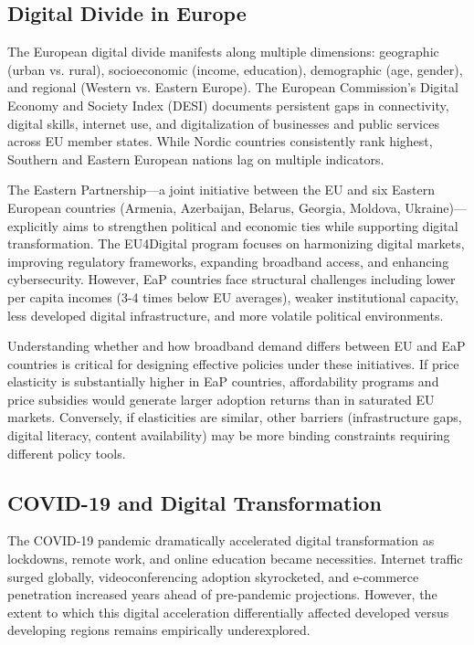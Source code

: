 \documentclass[12pt,review]{elsarticle}
\begin{document}
\subsection{Digital Divide in Europe}

The European digital divide manifests along multiple dimensions: geographic (urban vs. rural), socioeconomic (income, education), demographic (age, gender), and regional (Western vs. Eastern Europe). The European Commission's Digital Economy and Society Index (DESI) documents persistent gaps in connectivity, digital skills, internet use, and digitalization of businesses and public services across EU member states. While Nordic countries consistently rank highest, Southern and Eastern European nations lag on multiple indicators.

The Eastern Partnership—a joint initiative between the EU and six Eastern European countries (Armenia, Azerbaijan, Belarus, Georgia, Moldova, Ukraine)—explicitly aims to strengthen political and economic ties while supporting digital transformation. The EU4Digital program focuses on harmonizing digital markets, improving regulatory frameworks, expanding broadband access, and enhancing cybersecurity. However, EaP countries face structural challenges including lower per capita incomes (3-4 times below EU averages), weaker institutional capacity, less developed digital infrastructure, and more volatile political environments.

Understanding whether and how broadband demand differs between EU and EaP countries is critical for designing effective policies under these initiatives. If price elasticity is substantially higher in EaP countries, affordability programs and price subsidies would generate larger adoption returns than in saturated EU markets. Conversely, if elasticities are similar, other barriers (infrastructure gaps, digital literacy, content availability) may be more binding constraints requiring different policy tools.

\subsection{COVID-19 and Digital Transformation}

The COVID-19 pandemic dramatically accelerated digital transformation as lockdowns, remote work, and online education became necessities. Internet traffic surged globally, videoconferencing adoption skyrocketed, and e-commerce penetration increased years ahead of pre-pandemic projections. However, the extent to which this digital acceleration differentially affected developed versus developing regions remains empirically underexplored.
\end{document}
